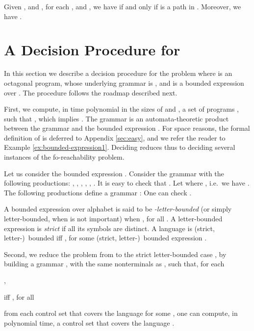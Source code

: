 \documentclass[final]{llncs}
\begin{document}
\begin{lemma}\label{fsa-dfk}
Given , and , for each 
,  and , we have
 if and only if 
is a path in . Moreover, we have .
\end{lemma}

\section{A Decision Procedure for }
\label{sec:bounded-control-sets}

In this section we describe a decision procedure for the
problem  where  is an octagonal program, whose underlying grammar
is , and  is
a bounded expression over . The procedure follows the
roadmap described next. 

First, we compute, in time polynomial in the sizes of
 and , a set of programs
, 
such that ,
which implies .  The grammar  is
an automata-theoretic product between the grammar  and the bounded expression . For space
reasons, the formal definition of  is deferred to
Appendix \ref{sec:easy}, and we refer the reader to
Example \ref{ex:bounded-expression1}. 
Deciding 
reduces thus to deciding several
instances  of the
fo-reachability problem.

\begin{example}\label{ex:bounded-expression1}
  Let us consider the bounded expression . 
  Consider the grammar  with the following productions: 
  ,  
  ,
  ,
  ,
  ,
  . 
It is easy to check that .  
  Let  where 
  , 
  i.e.\ we have .  The following productions define a grammar : 
  {\small}
One can check . 
\end{example}

A bounded expression  over
alphabet  is said to be {\em -letter-bounded} (or simply
letter-bounded, when  is not important) when , for all
. A letter-bounded expression  is \emph{strict}
if all its symbols are distinct. A language  is
(strict, letter-)~bounded if{}f , for some (strict,
letter-)~bounded expression .

Second, we reduce the problem from  to the
strict letter-bounded case , by building a
grammar , with the same nonterminals as , such
that, for each 
\begin{inparaenum}
\item ,
\item  if{}f 
	, for all 
\item\label{it:transposition} from each control set  that covers the language 
 for some , 
one can compute, in polynomial time, a control
set  that covers the
language .
\end{inparaenum}
\end{document}
